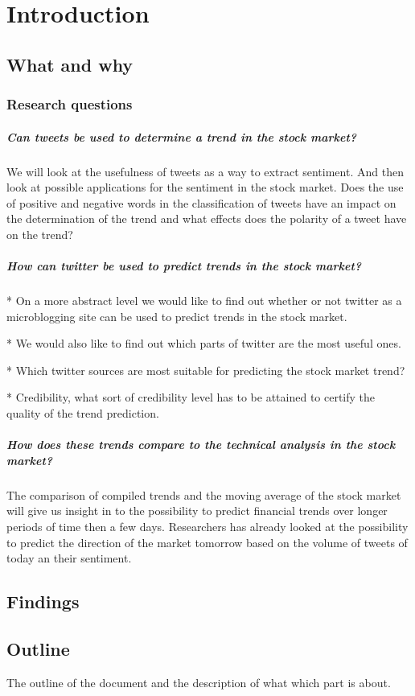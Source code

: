 \chapter{Introduction}

\section{What and why}

\subsection{Research questions}
	\paragraph{Can tweets be used to determine a trend in the stock market?\\}
	We will look at the usefulness of tweets as a way to extract sentiment. And
then look at possible applications for the sentiment in the stock market. 
Does the use of positive and negative words in the classification of tweets
have an impact on the determination of the trend and what effects does the
polarity of a tweet have on the trend?

	\paragraph{How can twitter be used to predict trends in the stock market?\\}
* On a more abstract level we would like to find out whether or not twitter as a
microblogging site can be used to predict trends in the stock market.

* We would also like to find out which parts of twitter are the most useful
ones. 

* Which twitter sources are most suitable for predicting the stock market
trend?

* Credibility, what sort of credibility level has to be attained to certify the
quality of the trend prediction. 

	\paragraph{How does these trends compare to the technical analysis in the
stock market?\\}
	The comparison of compiled trends and the moving average of the stock
market will  give us insight in to the possibility to predict financial trends
over longer periods of time then a few days. Researchers has already looked at
the possibility to predict the direction of the market tomorrow based on the
volume of tweets of today an their sentiment. 

\section{Findings}

\section{Outline}
The outline of the document and the description of what which part is about. 


